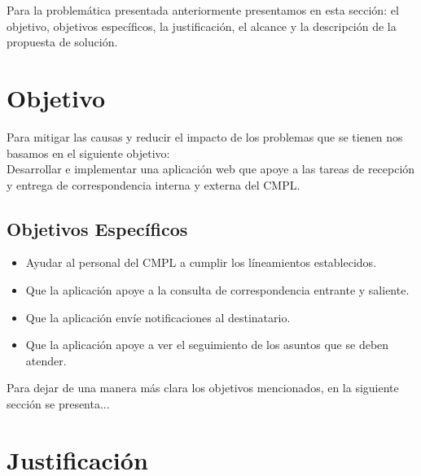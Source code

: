 Para la problemática presentada anteriormente presentamos en esta sección: el objetivo, objetivos específicos, la justificación, el alcance y la descripción de la propuesta de solución.\\

\section{Objetivo}

Para mitigar las causas y reducir el impacto de los problemas que se tienen nos basamos en el siguiente objetivo: \\

Desarrollar e implementar una aplicación web que apoye a las tareas de recepción y entrega de correspondencia interna y externa del CMPL. \\

\subsection{Objetivos Específicos}

\begin{itemize}
	\item Ayudar al personal del CMPL a cumplir los líneamientos establecidos. %
	\item Que la aplicación apoye a la consulta de correspondencia entrante y saliente.
	\item Que la aplicación envíe notificaciones al destinatario.
	\item Que la aplicación apoye a ver el seguimiento de los asuntos que se deben atender.
\end{itemize}

Para dejar de una manera más clara los objetivos mencionados, en la siguiente sección se presenta...

\section{Justificación}

